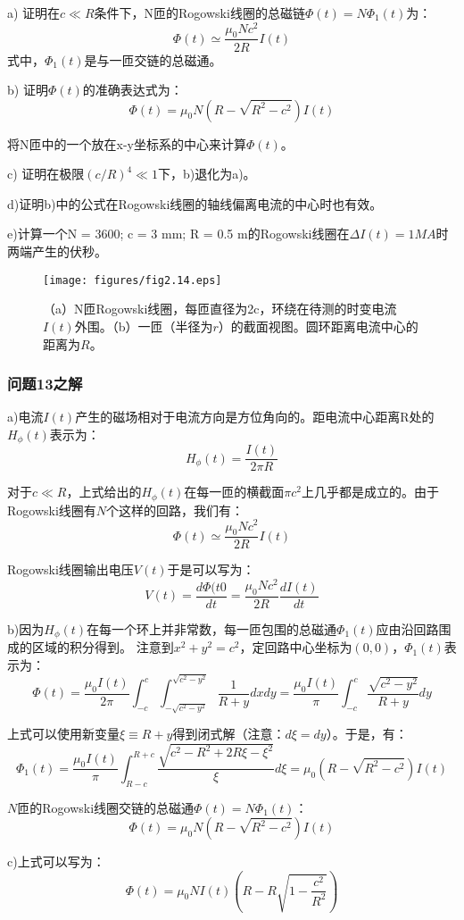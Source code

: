 a) 证明在$c\ll R$条件下，N匝的Rogowski线圈的总磁链$\Phi(t)=N\Phi_1(t)$为：
$$\Phi(t)\simeq\frac{\mu_0 N c^2}{2R}I(t)$$
式中，$\Phi_1(t)$是与一匝交链的总磁通。

b) 证明$\Phi(t)$的准确表达式为：
$$\Phi(t)=\mu_0 N (R-\sqrt{R^2-c^2})I(t)$$

将N匝中的一个放在x-y坐标系的中心来计算$\Phi(t)$。

c) 证明在极限$(c/R)^4\ll 1$下，b)退化为a)。

d)证明b)中的公式在Rogowski线圈的轴线偏离电流的中心时也有效。

e)计算一个N = 3600; c = 3 mm; R = 0.5 m的Rogowski线圈在$\Delta I(t)=1MA$时两端产生的伏秒。

\begin{figure}
  \centering
 \texttt{[image: figures/fig2.14.eps]}
  \caption{（a）N匝Rogowski线圈，每匝直径为2c，环绕在待测的时变电流$I(t)$外围。（b）一匝（半径为$r$）的截面视图。圆环距离电流中心的距离为$R$。}
\end{figure}

\subsubsection{问题13之解}
a)电流$I(t)$产生的磁场相对于电流方向是方位角向的。距电流中心距离R处的$H_\phi(t)$表示为：
$$H_\phi (t)=\frac{I(t)}{2\pi R}$$

对于$c\ll R$，上式给出的$H_\phi(t)$在每一匝的横截面$\pi c^2$上几乎都是成立的。由于Rogowski线圈有$N$个这样的回路，我们有：
$$\Phi(t)\simeq \frac{\mu_0 N c^2}{2R}I(t)$$

Rogowski线圈输出电压$V(t)$于是可以写为：
$$V(t)=\frac{d\Phi(t0}{dt}=\frac{\mu_0 N c^2}{2R}\frac{dI(t)}{dt}$$

b)因为$H_\phi (t)$在每一个环上并非常数，每一匝包围的总磁通$\Phi_1(t)$应由沿回路围成的区域的积分得到。
注意到$x^2+y^2=c^2$，定回路中心坐标为$(0,0)$，$\Phi_1(t)$表示为：
$$\Phi (t)=\frac{\mu_0 I(t)}{2\pi}\int_{-c}^{c}\int_{-\sqrt{c^2-y^2}}^{\sqrt{c^2-y^2}}\frac{1}{R+y}dxdy=\frac{\mu_0 I(t)}{\pi}\int_{-c}^{c}\frac{\sqrt{c^2-y^2}}{R+y}dy$$

上式可以使用新变量$\xi\equiv R+y$得到闭式解（注意：$d\xi=dy$）。于是，有：
$$\Phi_1 (t)=\frac{\mu_0 I(t)}{\pi} \int_{R-c}^{R+c}\frac{\sqrt{c^2-R^2+2R\xi-\xi^2}}{\xi}d\xi=\mu_0(R-\sqrt{R^2-c^2})I(t)$$

$N$匝的Rogowski线圈交链的总磁通$\Phi(t)=N\Phi_1(t)$：
$$\Phi (t)=\mu_0 N(R-\sqrt{R^2-c^2})I(t)$$

c)上式可以写为：
$$\Phi (t)=\mu_0 NI(t)(R-R\sqrt{1-\frac{c^2}{R^2}})$$

